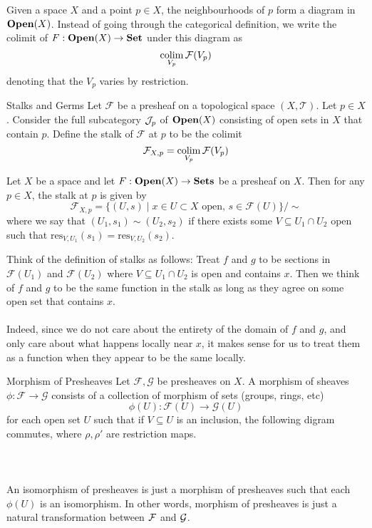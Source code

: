 \documentclass[a4paper]{article}
\begin{document}
Given a space $X$ and a point $p\in X$, the neighbourhoods of $p$ form a diagram in $\bold{Open}(X)$. Instead of going through the categorical definition, we write the colimit of $F:\bold{Open}(X)\to\bold{Set}$ under this diagram as $$\operatorname*{colim}_{V_p}\mathcal{F}(V_p)$$ denoting that the $V_p$ varies by restriction. 

\begin{defn}{Stalks and Germs}{} Let $\mathcal{F}$ be a presheaf on a topological space $(X,\mathcal{T})$. Let $p\in X$. Consider the full subcategory $\mathcal{J}_p$ of $\bold{Open}(X)$ consisting of open sets in $X$ that contain $p$. Define the stalk of $\mathcal{F}$ at $p$ to be the colimit $$\mathcal{F}_{X,p}=\operatorname*{colim}_{V_p}\mathcal{F}(V_p)$$ 
\end{defn}

\begin{lmm}{}{} Let $X$ be a space and let $F:\bold{Open}(X)\to\bold{Sets}$ be a presheaf on $X$. Then for any $p\in X$, the stalk at $p$ is given by $$\mathcal{F}_{X,p}=\{(U,s)\;|\;x\in U\subset X\text{ open, }s\in\mathcal{F}(U)\}/\sim$$ where we say that $(U_1,s_1)\sim(U_2,s_2)$ if there exists some $V\subseteq U_1\cap U_2$ open such that $\text{res}_{V,U_1}(s_1)=\text{res}_{V,U_2}(s_2)$. 
\end{lmm}

Think of the definition of stalks as follows: Treat $f$ and $g$ to be sections in $\mathcal{F}(U_1)$ and $\mathcal{F}(U_2)$ where $V\subseteq U_1\cap U_2$ is open and contains $x$. Then we think of $f$ and $g$ to be the same function in the stalk as long as they agree on some open set that contains $x$. \\~\\

Indeed, since we do not care about the entirety of the domain of $f$ and $g$, and only care about what happens locally near $x$, it makes sense for us to treat them as a function when they appear to be the same locally. 

\begin{defn}{Morphism of Presheaves}{} Let $\mathcal{F},\mathcal{G}$ be presheaves on $X$. A morphism of sheaves $\phi:\mathcal{F}\to\mathcal{G}$ consists of a collection of morphism of sets (groups, rings, etc) $$\phi(U):\mathcal{F}(U)\to\mathcal{G}(U)$$ for each open set $U$ such that if $V\subseteq U$ is an inclusion, the following digram commutes, where $\rho,\rho'$ are restriction maps. \\~\\
 \\~\\
An isomorphism of presheaves is just a morphism of presheaves such that each $\phi(U)$ is an isomorphism. In other words, morphism of presheaves is just a natural transformation between $\mathcal{F}$ and $\mathcal{G}$.  
\end{defn}
\end{document}
